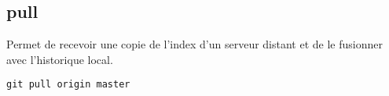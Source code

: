 \subsection*{pull}
Permet de recevoir une copie de l'index d'un serveur distant et de le fusionner avec l'historique local.
\begin{verbatim}
git pull origin master
\end{verbatim}
